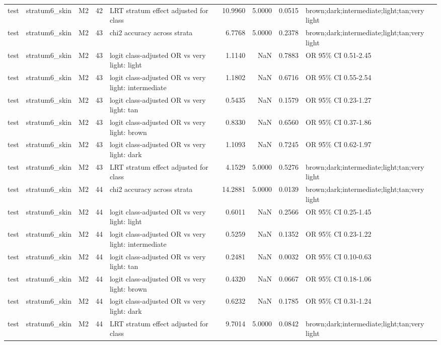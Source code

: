 \begin{tabular}{lllrlrrrl}
test & stratum6\_skin & M2 & 42 & LRT stratum effect adjusted for class & 10.9960 & 5.0000 & 0.0515 & brown;dark;intermediate;light;tan;very light \\
test & stratum6\_skin & M2 & 43 & chi2 accuracy across strata & 6.7768 & 5.0000 & 0.2378 & brown;dark;intermediate;light;tan;very light \\
test & stratum6\_skin & M2 & 43 & logit class-adjusted OR vs very light: light & 1.1140 & NaN & 0.7883 & OR 95\% CI 0.51-2.45 \\
test & stratum6\_skin & M2 & 43 & logit class-adjusted OR vs very light: intermediate & 1.1802 & NaN & 0.6716 & OR 95\% CI 0.55-2.54 \\
test & stratum6\_skin & M2 & 43 & logit class-adjusted OR vs very light: tan & 0.5435 & NaN & 0.1579 & OR 95\% CI 0.23-1.27 \\
test & stratum6\_skin & M2 & 43 & logit class-adjusted OR vs very light: brown & 0.8330 & NaN & 0.6560 & OR 95\% CI 0.37-1.86 \\
test & stratum6\_skin & M2 & 43 & logit class-adjusted OR vs very light: dark & 1.1093 & NaN & 0.7245 & OR 95\% CI 0.62-1.97 \\
test & stratum6\_skin & M2 & 43 & LRT stratum effect adjusted for class & 4.1529 & 5.0000 & 0.5276 & brown;dark;intermediate;light;tan;very light \\
test & stratum6\_skin & M2 & 44 & chi2 accuracy across strata & 14.2881 & 5.0000 & 0.0139 & brown;dark;intermediate;light;tan;very light \\
test & stratum6\_skin & M2 & 44 & logit class-adjusted OR vs very light: light & 0.6011 & NaN & 0.2566 & OR 95\% CI 0.25-1.45 \\
test & stratum6\_skin & M2 & 44 & logit class-adjusted OR vs very light: intermediate & 0.5259 & NaN & 0.1352 & OR 95\% CI 0.23-1.22 \\
test & stratum6\_skin & M2 & 44 & logit class-adjusted OR vs very light: tan & 0.2481 & NaN & 0.0032 & OR 95\% CI 0.10-0.63 \\
test & stratum6\_skin & M2 & 44 & logit class-adjusted OR vs very light: brown & 0.4320 & NaN & 0.0667 & OR 95\% CI 0.18-1.06 \\
test & stratum6\_skin & M2 & 44 & logit class-adjusted OR vs very light: dark & 0.6232 & NaN & 0.1785 & OR 95\% CI 0.31-1.24 \\
test & stratum6\_skin & M2 & 44 & LRT stratum effect adjusted for class & 9.7014 & 5.0000 & 0.0842 & brown;dark;intermediate;light;tan;very light \\

\end{tabular}
